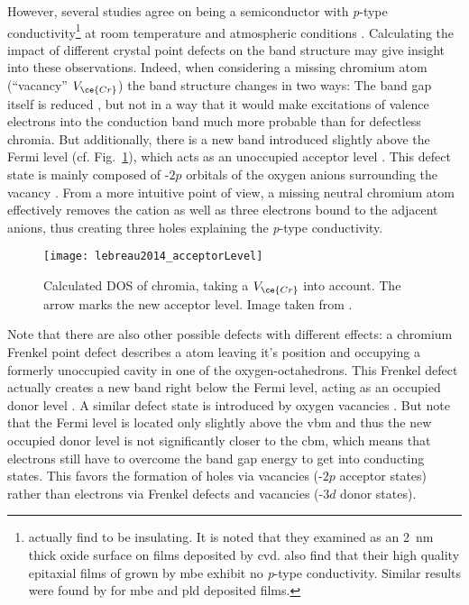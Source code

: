 However, several studies agree on  being a semiconductor with \textit{p}-type conductivity\footnote{
    \textcite{cheng2001a} actually find  to be insulating. It is noted that they examined  as an \qty{2}{\nm} thick oxide surface on  films deposited by \gls{cvd}.
    \textcite{farrell2015} also find that their high quality epitaxial films of  grown by \gls{mbe} exhibit no \textit{p}-type conductivity.
    Similar results were found by \textcite{kehoe2016} for \gls{mbe} and \gls{pld} deposited films.
}
at room temperature and atmospheric conditions
    \cite{kofstad1980,cheng1996,caricato2010,lebreau2014,mi2018,singh2019,polyakov2022a}.
Calculating the impact of different crystal point defects on the band structure may give insight into these observations.
Indeed, when considering a missing chromium atom (\enquote{vacancy} $V_{\ce{Cr}}$) the band structure changes in two ways:
The band gap itself is reduced \cite{mi2018}, but not in a way that it would make excitations of valence electrons into the conduction band much more probable than for defectless chromia.
But additionally, there is a new band introduced slightly above the Fermi level (cf. Fig.~\ref{Fig:lebreau2014_acceptorLevel}), which acts as an unoccupied acceptor level
    \cite{mi2018}.
This defect state is mainly composed of -$2p$ orbitals of the oxygen anions surrounding the vacancy
    \cite{lebreau2014}.
From a more intuitive point of view, a missing neutral chromium atom effectively removes the  cation as well as three electrons bound to the adjacent  anions, thus creating three holes \cite{lebreau2014} explaining the \textit{p}-type conductivity.
\begin{figure}
    \centering
    \texttt{[image: lebreau2014\_acceptorLevel]}
    \caption{Calculated \acrfull{DOS} of chromia, taking a $V_{\ce{Cr}}$ into account.
    The arrow marks the new acceptor level.
    Image taken from \cite{lebreau2014}.}
    \label{Fig:lebreau2014_acceptorLevel}
\end{figure}

Note that there are also other possible defects with different effects:
a chromium Frenkel point defect describes a  atom leaving it's position and occupying a formerly unoccupied cavity in one of the oxygen-octahedrons.
This Frenkel defect actually creates a new band right below the Fermi level, acting as an occupied donor level
    \cite{lebreau2014}.
A similar defect state is introduced by oxygen vacancies
    \cite{mi2018}.
But note that the Fermi level is located only slightly above the \gls{vbm} and thus the new occupied donor level is not significantly closer to the \gls{cbm}, which means that electrons still have to overcome the band gap energy to get into conducting states.
This favors the formation of holes via  vacancies (-$2p$ acceptor states) rather than electrons via  Frenkel defects and  vacancies (-$3d$ donor states).


